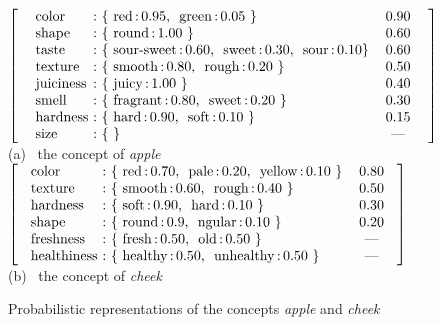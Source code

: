 \begin{figure}[t]
  \small
  \begin{center}
    $\left[~~
    \begin{tabular}[c]{l@{~:~}lc}
      color & \{ red\,:\,0.95,~ green\,:\,0.05 \} & 0.90\\
      shape & \{ round\,:\,1.00 \} & 0.60 \\
      taste & \{ sour-sweet\,:\,0.60,~ sweet\,:\,0.30,~ sour\,:\,0.10\} & 0.60 \\
      texture & \{ smooth\,:\,0.80,~ rough\,:\,0.20 \} & 0.50 \\
      juiciness & \{ juicy\,:\,1.00 \} & 0.40 \\
      smell & \{  fragrant\,:\,0.80,~ sweet\,:\,0.20 \} & 0.30 \\
      hardness & \{ hard\,:\,0.90,~ soft\,:\,0.10 \} & 0.15 \\
      size & \{  \} & --- \\
    \end{tabular}
    ~~\right]$ \\[.5\baselineskip]
    (a)~ the concept of {\it apple}\\[\baselineskip]
    $\left[~
    \begin{tabular}[c]{l@{~:~}lc}
      color & \{ red\,:\,0.70,~ pale\,:\,0.20,~ yellow\,:\,0.10 \} & 0.80 \\
      texture & \{ smooth\,:\,0.60,~ rough\,:\,0.40 \} & 0.50 \\
      hardness & \{ soft\,:\,0.90,~ hard\,:\,0.10 \} & 0.30 \\
      shape & \{ round\,:\,0.9,~ ngular\,:\,0.10 \} & 0.20 \\
      freshness & \{ fresh\,:\,0.50,~ old\,:\,0.50 \} & --- \\
      healthiness & \{ healthy\,:\,0.50,~ unhealthy\,:\,0.50 \} & --- \\
    \end{tabular}
    ~\right]$ \\[.7\baselineskip]
    (b)~ the concept of {\it cheek}
  \end{center}
  \caption{Probabilistic representations of the concepts {\it apple} and {\it cheek}}
  \label{fig:apple}
\end{figure}

